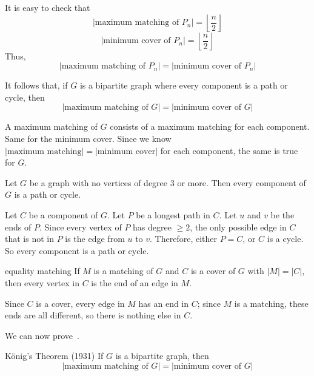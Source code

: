 It is easy to check that
\[ |\text{maximum matching of }P_n|=\left\lfloor \frac{n}{2} \right\rfloor \]
\[ |\text{minimum cover of }P_n|=\left\lfloor \frac{n}{2} \right\rfloor \]
Thus,
\[ |\text{maximum matching of }P_n|=|\text{minimum cover of }P_n| \]

It follows that, if $ G $ is a bipartite graph where every component is a path or cycle,
then
\[ |\text{maximum matching of }G|=|\text{minimum cover of }G|  \]
\begin{Proof}{}{}
    A maximum matching of $ G $ consists of a maximum matching for each component. Same for
    the minimum cover. Since we know $ |\text{maximum matching}|=|\text{minimum cover}| $
    for each component, the same is true for $ G $.
\end{Proof}


\begin{Proposition}{}{}
    Let $ G $ be a graph with no vertices of degree $ 3 $ or more. Then
    every component of $ G $ is a path or cycle.
\end{Proposition}

\begin{Proof}{}{}
    Let $ C $ be a component of $ G $. Let $ P $ be a longest path
    in $ C $. Let $ u $ and $ v $ be the ends of $ P $. Since every vertex
    of $ P $ has degree $ \geqslant 2 $, the only possible edge in $ C $ that is
    not in $ P $ is the edge from $ u $ to $ v $. Therefore, either
    $ P=C $, or $ C $ is a cycle. So every component is a path or cycle.
\end{Proof}


\begin{Proposition}{}{equality matching}
    If $ M $ is a matching of $ G $ and $ C $ is a cover of $ G $ with $ |M|=|C| $,
    then every vertex in $ C $ is the end of an edge in $ M $.
\end{Proposition}

\begin{Proof}{}{}
    Since $ C $ is a cover, every edge in $ M $ has an end in $ C $; since $ M $
    is a matching, these ends are all different, so there is nothing else in $ C $.
\end{Proof}
We can now prove~.

\begin{Theorem}{König's Theorem (1931)}{}
    If $ G $ is a bipartite graph, then
    \[ |\text{maximum matching of }G|=|\text{minimum cover of }G| \]
\end{Theorem}


